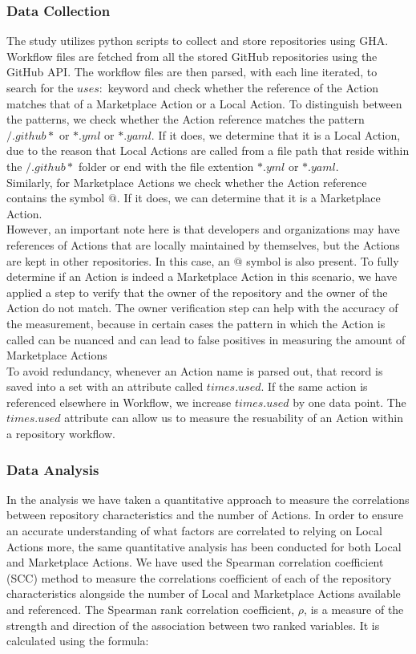 \documentclass[conference]{IEEEtran}
\begin{document}
          \subsubsection{\textbf{Data Collection}}
            The study utilizes python scripts\cite{Marof2024}  to collect and store repositories using GHA. Workflow files are fetched from all the stored GitHub repositories using the GitHub API.  The workflow files are then parsed, with each line iterated, to search for the $uses:$ keyword and check whether the reference of the Action matches that of a Marketplace Action or a Local Action. To distinguish between the patterns, we check whether the Action reference matches the pattern $/.github*$ or $*.yml$ or $*.yaml$. If it does, we determine that it is a Local Action, due to the reason that Local Actions are called from a file path that reside within the $/.github*$ folder or end with the file extention $*.yml$ or $*.yaml$.
            \\ Similarly, for Marketplace Actions we check whether the Action reference contains the symbol $@$. If it does, we can determine that it is a Marketplace Action. \\ However, an important note here is that developers and organizations may have references of Actions that are locally maintained by themselves, but the Actions are kept in other repositories. In this case, an $@$ symbol is also present. To fully determine if an Action is indeed a Marketplace Action in this scenario, we have applied a step to verify that the owner of the repository and the owner of the Action do not match. The owner verification step can help with the accuracy of the measurement, because in certain cases the pattern in which the Action is called can be nuanced and can lead to false positives in measuring the amount of Marketplace Actions\\ 
            To avoid redundancy, whenever an Action name is parsed out, that record is saved into a set with an attribute called $times.used$. If the same action is referenced elsewhere in Workflow, we increase $times.used$ by one data point. The $times.used$ attribute can allow us to measure the resuability of an Action within a repository workflow.\\

          \subsubsection{\textbf{Data Analysis}}
            In the analysis we have taken a quantitative approach to measure the correlations between repository characteristics and the number of Actions. In order to ensure an accurate understanding of what factors are correlated to relying on Local Actions more, the same quantitative analysis has been conducted for both Local and Marketplace Actions. We have used the Spearman correlation coefficient (SCC) method to measure the correlations coefficient of each of the repository characteristics alongside the number of Local and Marketplace Actions available and referenced. The Spearman rank correlation coefficient, \(\rho\), is a measure of the strength and direction of the association between two ranked variables. It is calculated using the formula:
\end{document}
